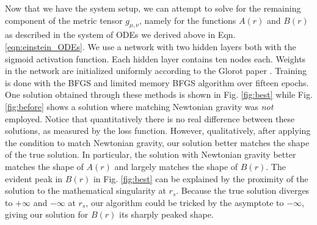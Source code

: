 \documentclass{CUP-JNL-DTM}%
\theoremstyle{definition}
\numberwithin{equation}{section}
\begin{document}
Now that we have the system setup, we can attempt to solve for the remaining component of the metric tensor $g_{\mu,\nu}$, namely for the functions $A(r)$ and $B(r)$ as described in the system of ODEs we derived above in Eqn. \ref{eqn:einstein_ODEs}. We use a network with two hidden layers both with the sigmoid activation function. Each hidden layer contains ten nodes each. Weights in the network are initialized uniformly according to the Glorot paper \cite{glorotUnderstandingDifficultyTraining2010}. Training is done with the BFGS and limited memory BFGS algorithm \cite{liuLimitedMemoryBFGS1989} over fifteen epochs. One solution obtained through these methods is shown in Fig. \ref{fig:best} while Fig. \ref{fig:before} shows a solution where matching Newtonian gravity was \emph{not} employed. Notice that quantitatively there is no real difference between these solutions, as measured by the loss function. However, qualitatively, after applying the condition to match Newtonian gravity, our solution better matches the shape of the true solution. In particular, the solution with Newtonian gravity better matches the shape of $A(r)$ and largely matches the shape of $B(r)$. The evident peak in $B(r)$ in Fig. \ref{fig:best} can be explained by the proximity of the solution to the mathematical singularity at $r_s$. Because the true solution diverges to $+\infty$ and $-\infty$ at $r_s$, our algorithm could be tricked by the asymptote to $-\infty$, giving our solution for $B(r)$ its sharply peaked shape. 
\end{document}
